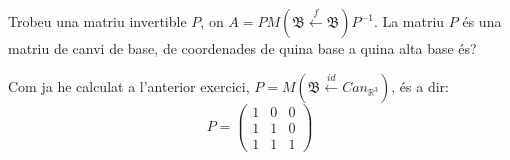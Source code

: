 \documentclass[a4paper, 12pt]{article}
\begin{document}
    \begin{exercici}
        Trobeu una matriu invertible $P$, on $A = PM(\mathfrak{B} \xleftarrow{f} \mathfrak{B})P^{-1}$. La
        matriu $P$ és una matriu de canvi de base, de coordenades de quina base a quina alta base és?
    \end{exercici}
    \begin{solucio}
        Com ja he calculat a l'anterior exercici, $P = M(\mathfrak{B} \xleftarrow{id} Can_{\mathbb{R}^3})$,
        és a dir:
        \begin{displaymath}
            P =
            \left(
                \begin{array}{ccc}
                    1 & 0 & 0\\
                    1 & 1 & 0\\
                    1 & 1 & 1
                \end{array}
            \right)
        \end{displaymath}
    \end{solucio}
\end{document}
